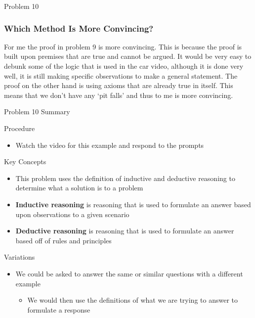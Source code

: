\begin{problem}{Problem 10}
\begin{highlight}[Solution]
        \subsubsection*{Which Method Is More Convincing?}

        For me the proof in problem 9 is more convincing. This is because the proof is built upon premises that are true and cannot be argued. It would be very easy to debunk some of
        the logic that is used in the car video, although it is done very well, it is still making specific observations to make a general statement. The proof on the other hand is
        using axioms that are already true in itself. This means that we don't have any `pit falls' and thus to me is more convincing.
        
    \end{highlight}
\end{problem}

\begin{summary}{Problem 10 Summary}
    \begin{statement}{Procedure}
        \begin{itemize}
            \item Watch the video for this example and respond to the prompts
        \end{itemize}
    \end{statement}
    \begin{statement}{Key Concepts}
        \begin{itemize}
            \item This problem uses the definition of inductive and deductive reasoning to determine what a solution is to a problem
            \item \textbf{Inductive reasoning} is reasoning that is used to formulate an answer based upon observations to a given scenario
            \item \textbf{Deductive reasoning} is reasoning that is used to formulate an answer based off of rules and principles
        \end{itemize}
    \end{statement}
    \begin{statement}{Variations}
        \begin{itemize}
            \item We could be asked to answer the same or similar questions with a different example
            \begin{itemize}
                \item We would then use the definitions of what we are trying to answer to formulate a response
            \end{itemize}
        \end{itemize}
    \end{statement}
\end{summary}